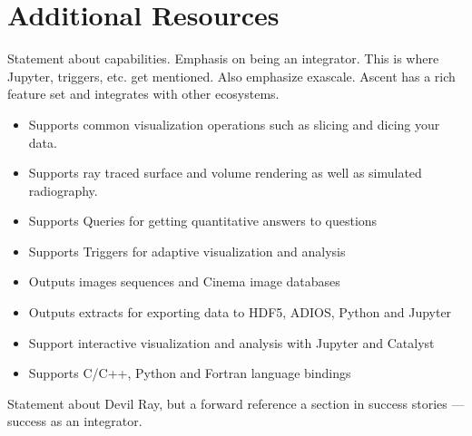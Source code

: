 \documentclass[graybox]{svmult}
\newcommand{\fix}[1]{\textcolor{red}{#1}} %
\begin{document}
\section{Additional Resources}
\label{sec:information}



Statement about capabilities.  Emphasis on being an integrator.
This is where Jupyter, triggers, etc. get mentioned.  Also emphasize
exascale.
Ascent has a rich feature set and integrates with other ecosystems.

\begin{itemize}
  \item Supports common visualization operations such as slicing and dicing your data.
  \item Supports ray traced surface and volume rendering as well as simulated radiography.
  \item Supports Queries for getting quantitative answers to questions
  \item Supports Triggers for adaptive visualization and analysis
  \item Outputs images sequences and Cinema image databases
  \item Outputs extracts for exporting data to HDF5, ADIOS, Python and Jupyter
  \item Support interactive visualization and analysis with Jupyter and Catalyst
  \item Supports C/C++, Python and Fortran language bindings
\end{itemize}

Statement about Devil Ray, but a forward reference a section in success stories --- success as an integrator.
\fi




%


%

%




\end{document}
